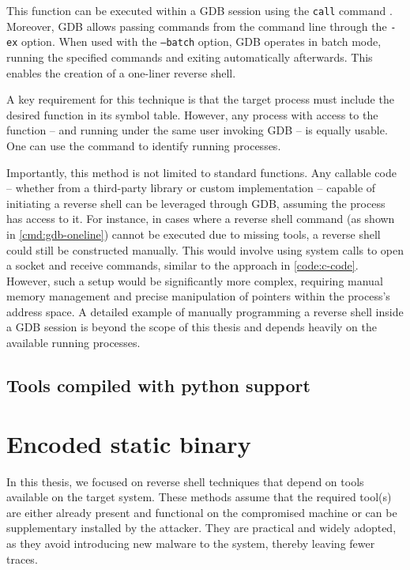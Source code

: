 This function can be executed within a GDB session using the \texttt{call} command \cite{gdb-man}. Moreover, GDB allows passing commands from the command line through the \texttt{-ex} option. When used with the \texttt{--batch} option, GDB operates in batch mode, running the specified commands and exiting automatically afterwards. This enables the creation of a one-liner reverse shell.


A key requirement for this technique is that the target process must include the desired function in its symbol table. However, any process with access to the function -- and running under the same user invoking GDB -- is equally usable. One can use the  command to identify running processes.

Importantly, this method is not limited to standard functions. Any callable code -- whether from a third-party library or custom implementation -- capable of initiating a reverse shell can be leveraged through GDB, assuming the process has access to it. For instance, in cases where a reverse shell command (as shown in \cref{cmd:gdb-oneline}) cannot be executed due to missing tools, a reverse shell could still be constructed manually. This would involve using system calls to open a socket and receive commands, similar to the approach in \cref{code:c-code}. However, such a setup would be significantly more complex, requiring manual memory management and precise manipulation of pointers within the process's address space. A detailed example of manually programming a reverse shell inside a GDB session is beyond the scope of this thesis and depends heavily on the available running processes.


\subsection{Tools compiled with python support}



\section{Encoded static binary}

In this thesis, we focused on reverse shell techniques that depend on tools available on the target system. These methods assume that the required tool(s) are either already present and functional on the compromised machine or can be supplementary installed by the attacker. They are practical and widely adopted, as they avoid introducing new malware to the system, thereby leaving fewer traces.

